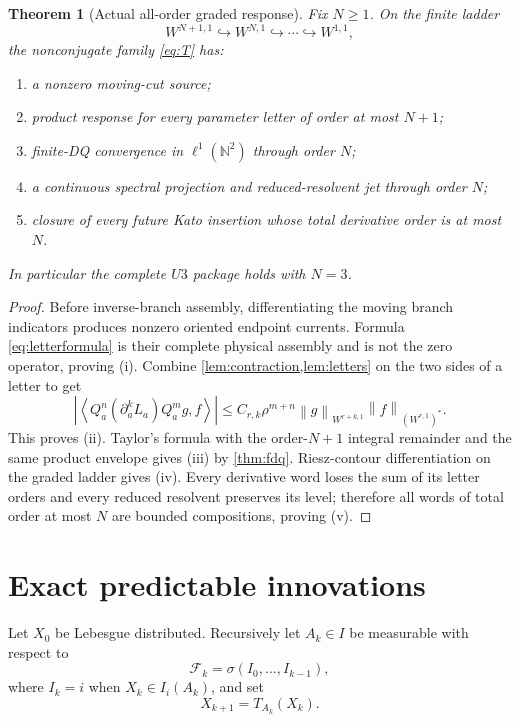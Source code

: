 \documentclass[11pt,reqno]{amsart}
\newtheorem{theorem}{Theorem}[section]
\theoremstyle{definition}
\theoremstyle{remark}
\newcommand{\F}{\mathcal F}
\newcommand{\N}{\mathbb N}
\newcommand{\norm}[1]{\left\lVert #1\right\rVert}
\newcommand{\abs}[1]{\left\lvert #1\right\rvert}
\newcommand{\pair}[2]{\left\langle #1,#2\right\rangle}
\begin{document}
\begin{theorem}[Actual all-order graded response]\label{thm:all-order}
Fix $N\ge1$.  On the finite ladder
\[
 W^{N+1,1}\hookrightarrow W^{N,1}\hookrightarrow\cdots
 \hookrightarrow W^{1,1},
\]
the nonconjugate family \eqref{eq:T} has:
\begin{enumerate}[label=(\roman*)]
\item a nonzero moving-cut source;
\item product response for every parameter letter of order at most $N+1$;
\item finite-DQ convergence in $\ell^1(\N^2)$ through order $N$;
\item a continuous spectral projection and reduced-resolvent jet through order
$N$;
\item closure of every future Kato insertion whose total derivative order is
at most $N$.
\end{enumerate}
In particular the complete $U3$ package holds with $N=3$.
\end{theorem}

\begin{proof}
Before inverse-branch assembly, differentiating the moving branch indicators
produces nonzero oriented endpoint currents.  Formula \eqref{eq:letterformula}
is their complete physical assembly and is not the zero operator, proving (i).
Combine \cref{lem:contraction,lem:letters} on the two sides of a letter to get
\[
 \abs{\pair{Q_a^n(\partial_a^kL_a)Q_a^m g}{f}}
 \le C_{r,k}\rho^{m+n}
 \norm g_{W^{r+k,1}}\norm f_{(W^{r,1})^*}.
\]
This proves (ii).  Taylor's formula with the order-$N+1$ integral remainder
and the same product envelope gives (iii) by \cref{thm:fdq}.  Riesz-contour
differentiation on the graded ladder gives (iv).  Every derivative word loses
the sum of its letter orders and every reduced resolvent preserves its level;
therefore all words of total order at most $N$ are bounded compositions,
proving (v).
\end{proof}

\section{Exact predictable innovations}\label{sec:innovations}

Let $X_0$ be Lebesgue distributed.  Recursively let
$A_k\in I$ be measurable with respect to
\[
 \F_k=\sigma(I_0,\ldots,I_{k-1}),
\]
where $I_k=i$ when $X_k\in I_i(A_k)$, and set
\[
 X_{k+1}=T_{A_k}(X_k).
\]
\end{document}
